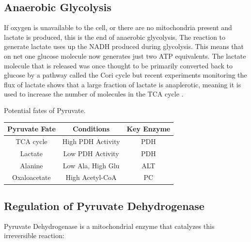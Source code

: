 \documentclass{tufte-handout}
\begin{document}
\subsection{Anaerobic Glycolysis}
If oxygen is unavailable to the cell, or there are no mitochondria present and lactate is produced, this is the end of anaerobic glycolysis.  The reaction to generate lactate uses up the NADH produced during glycolysis.  This means that on net one glucose molecule now generates just two ATP equivalents.  The lactate molecule that is released was once thought to be primarily converted back to glucose by a pathway called the Cori cycle but recent experiments monitoring the flux of lactate shows that a large fraction of lactate is anaplerotic, meaning it is used to increase the number of molecules in the TCA cycle \citep{Hui2017,Ferguson2018}.

\begin{margintable}
\centering
\caption{Potential fates of Pyruvate.}
\label{tab:pyruvate-fates}
\begin{tabular}{ccc}
\hline
\textbf {Pyruvate Fate} & \textbf{Conditions}  & \textbf{Key Enzyme} \\
\hline
TCA cycle & High PDH Activity & PDH \\
Lactate & Low PDH Activity & PDH \\
Alanine & Low Ala, High Glu & ALT\\
Oxaloacetate & High Acetyl-CoA & PC \\
\hline
\end{tabular}
\end{margintable}


\subsection{Regulation of Pyruvate Dehydrogenase}

Pyruvate Dehydrogenase is a mitochondrial enzyme that catalyzes this irreversible reaction:
\end{document}
